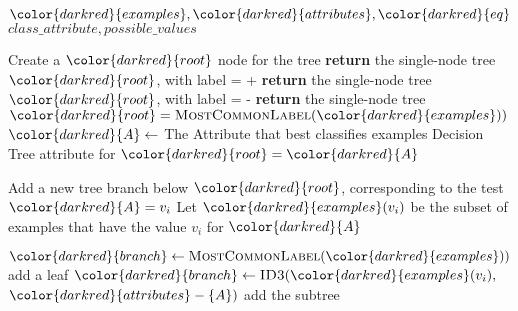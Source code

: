 \begin{algorithm}[H]
\caption{}\label{a:id3-pp}
\begin{algorithmic}[1]
\renewcommand{\algorithmicrequire}{\textbf{Private Vars:}}
\Require ${\color{darkred}{examples}}, {\color{darkred}{attributes}}, {\color{darkred}{eq}}$
\renewcommand{\algorithmicrequire}{\textbf{Global Vars:}}
\Require $class\_attribute, possible\_values$

    \State Create a ${\color{darkred}{root}}$ node for the tree
        \State \textbf{return} the single-node tree ${\color{darkred}{root}}$, with label = +
        \State \textbf{return} the single-node tree ${\color{darkred}{root}}$, with label = -
        \State \textbf{return} the single-node tree ${\color{darkred}{root}} = \textsc{MostCommonLabel}({\color{darkred}{examples}}))$
    \Else
        \State ${\color{darkred}{A}} \gets$ The Attribute that best classifies examples
        \State Decision Tree attribute for ${\color{darkred}{root}} = {\color{darkred}{A}}$

            \State Add a new tree branch below ${\color{darkred}{root}}$, corresponding to the test ${\color{darkred}{A}} = v_i$
            \State Let ${\color{darkred}{examples}}(v_i)$ be the subset of examples that have the value $v_i$ for ${\color{darkred}{A}}$

                \State ${\color{darkred}{branch}} \gets \textsc{MostCommonLabel}({\color{darkred}{examples}}))$ add a leaf
            \Else
                \State ${\color{darkred}{branch}} \gets \textsc{ID3}({\color{darkred}{examples}}(v_i),$ ${\color{darkred}{attributes}} - \{A\})$ add the subtree
            \EndIf
        \EndFor
    \EndIf
\EndProcedure

\end{algorithmic}
\end{algorithm}

